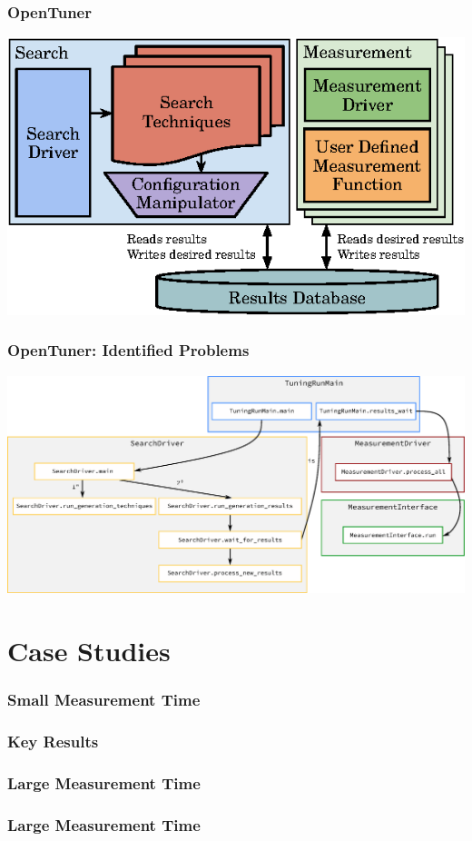 \documentclass[10pt, compress, aspectratio=169]{beamer}
\begin{document}
\begin{frame}
    \frametitle{OpenTuner}
    \begin{center}
        \includegraphics[width=.6\textwidth]{opentuner_arch}
    \end{center}
\end{frame}

\begin{frame}
    \frametitle{OpenTuner: Identified Problems}
    \begin{center}
        \includegraphics[width=.9\textwidth]{opentuner_callgraph}
    \end{center}
\end{frame}

\section{Case Studies}

\begin{frame}
    \frametitle{Small Measurement Time}
\end{frame}

\begin{frame}
    \frametitle{Key Results}
\end{frame}

\begin{frame}
    \frametitle{Large Measurement Time}
\end{frame}

\begin{frame}
    \frametitle{Large Measurement Time}
\end{frame}
\end{document}
